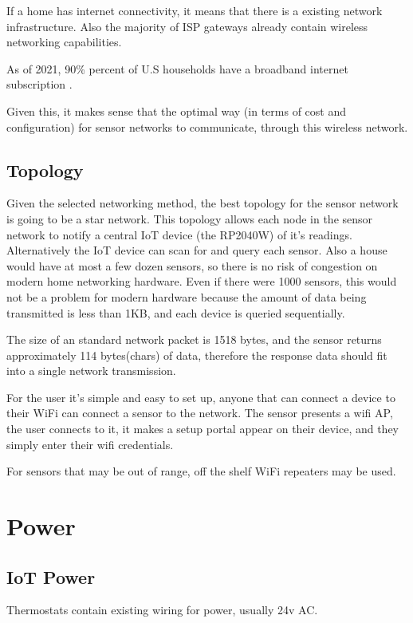 \documentclass[10pt, journal]{IEEEtran} %
\begin{document}
If a home has internet connectivity, it means that there is a existing network infrastructure.
Also the majority of ISP gateways already contain wireless networking capabilities.

As of 2021, 90\% percent of U.S households have a broadband internet subscription \cite{censusgov}.

Given this, it makes sense that the optimal way (in terms of cost and configuration) for sensor networks to communicate,
through this wireless network.

\subsection{Topology}

Given the selected networking method, the best topology for the sensor network is going to be a star network. 
This topology allows each node in the sensor network to notify a central IoT device (the RP2040W) of it's readings.
Alternatively the IoT device can scan for and query each sensor.
Also a house would have at most a few dozen sensors, so there is no risk of congestion on modern home networking hardware.
Even if there were 1000 sensors, this would not be a problem for modern hardware because the amount of data being transmitted is less than 1KB,
and each device is queried sequentially.

The size of an standard network packet is 1518 bytes, 
and the sensor returns approximately 114 bytes(chars) of data,
therefore the response data should fit into a single network transmission.

For the user it's simple and easy to set up, anyone that can connect a device to their WiFi can connect a sensor to the network.
The sensor presents a wifi AP, 
the user connects to it, 
it makes a setup portal appear on their device, 
and they simply enter their wifi credentials.

For sensors that may be out of range,
off the shelf WiFi repeaters may be used.

\section{Power}

\subsection{IoT Power}

Thermostats contain existing wiring for power, usually 24v AC.
\end{document}
